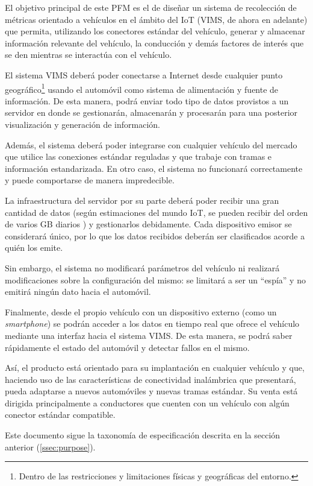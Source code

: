El objetivo principal de este \ac{PFM} es el de diseñar un sistema de recolección
de métricas orientado a vehículos en el ámbito del \ac{IoT} (\ac{VIMS}, de ahora en adelante)
que permita, utilizando los conectores estándar del vehículo, generar y almacenar
información relevante del vehículo, la conducción y demás factores de interés que
se den mientras se interactúa con el vehículo.

El sistema \ac{VIMS} deberá poder conectarse a Internet desde cualquier punto
geográfico\footnote{Dentro de las restricciones y limitaciones físicas y 
geográficas del entorno.} usando el automóvil como sistema de alimentación y
fuente de información. De esta manera, podrá enviar todo tipo de datos provistos 
a un servidor en donde se gestionarán, almacenarán y procesarán para 
una posterior visualización y generación de información.

Además, el sistema deberá poder integrarse con cualquier vehículo del mercado que
utilice las conexiones estándar reguladas y que trabaje con tramas e información
estandarizada. En otro caso, el sistema no funcionará correctamente y puede
comportarse de manera impredecible.

La infraestructura del servidor por su parte deberá poder recibir una gran cantidad
de datos (según estimaciones del mundo \ac{IoT}, se pueden recibir del orden de
varios \ac{GB} diarios \cite{vishHowMuchData2020}) y gestionarlos debidamente.
Cada dispositivo emisor se considerará único, por lo que los datos recibidos
deberán ser clasificados acorde a quién los emite.

Sin embargo, el sistema no modificará parámetros del vehículo ni realizará
modificaciones sobre la configuración del mismo: se limitará a ser un ``espía''
y no emitirá ningún dato hacia el automóvil.

Finalmente, desde el propio vehículo con un dispositivo externo (como un
\textit{smartphone}) se podrán acceder a los datos en tiempo real que ofrece el
vehículo mediante una interfaz hacia el sistema \ac{VIMS}. De esta manera, se
podrá saber rápidamente el estado del automóvil y detectar fallos en el mismo.

Así, el producto está orientado para su implantación en cualquier vehículo y que,
haciendo uso de las características de conectividad inalámbrica que presentará, pueda
adaptarse a nuevos automóviles y nuevas tramas estándar. Su venta está dirigida
principalmente a conductores que cuenten con un vehículo con algún conector estándar
compatible.

Este documento sigue la taxonomía de especificación descrita en la sección anterior (\ref{ssec:purpose}).
